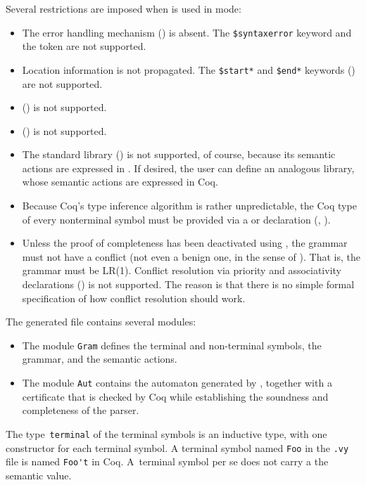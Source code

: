 \documentclass[onecolumn,11pt,nocopyrightspace,preprint]{sigplanconf}
\begin{document}
Several restrictions are imposed when \menhir is used in \ocoq mode:
%
\begin{itemize}
\item The error handling mechanism () is absent.
      The \verb+$syntaxerror+ keyword and the \error token are not supported.
\item Location information is not propagated. The \verb+$start*+ and \verb+$end*+
      keywords () are not supported.
\item \dparameter () is not supported.
\item \dinline () is not supported.
\item The standard library () is not supported, of course,
      because its semantic actions are expressed in \ocaml. If desired, the user can define
      an analogous library, whose semantic actions are expressed in Coq.
\item Because Coq's type inference algorithm is rather unpredictable,
      the Coq type of every nonterminal symbol must be provided via a
      \dtype or \dstart declaration (, ).
\item Unless the proof of completeness has been deactivated using
  \ocoqnocomplete, the grammar must not have a conflict
  (not even a benign one, in the sense of ).
  That is, the grammar must be LR(1). Conflict resolution via
  priority and associativity declarations ()
  is not supported.
  The reason is that there is no simple formal specification
  of how conflict resolution should work.
\end{itemize}

The generated file contains several modules:

\begin{itemize}
\item The module \verb+Gram+ defines the terminal and
  non-terminal symbols, the grammar, and the semantic actions.
\item The module \verb+Aut+ contains the automaton
  generated by \menhir, together with a certificate that is checked by Coq
  while establishing the soundness and completeness of the parser.
\end{itemize}

The type~\verb+terminal+ of the terminal symbols is an inductive type, with
one constructor for each terminal symbol. A terminal symbol named \verb+Foo+
in the \verb+.vy+ file is named \verb+Foo't+ in Coq. A~terminal symbol per se
does not carry a the semantic value.
\end{document}
